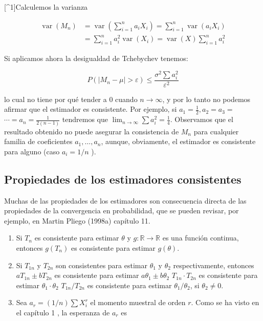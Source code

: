 \documentclass[
]{article}
\providecommand{\tightlist}{%
  \setlength{\itemsep}{0pt}\setlength{\parskip}{0pt}}
\begin{document}
{[}\^{}1{]}Calculemos la varianza

\[
\begin{aligned}
\operatorname{var}\left(M_{n}\right) & =\operatorname{var}\left(\sum_{i=1}^{n} a_{i} X_{i}\right)=\sum_{i=1}^{n} \operatorname{var}\left(a_{i} X_{i}\right) \\
& =\sum_{i=1}^{n} a_{i}^{2} \operatorname{var}\left(X_{i}\right)=\operatorname{var}(X) \sum_{i=1}^{n} a_{i}^{2}
\end{aligned}
\]

Si aplicamos ahora la desigualdad de Tchebychev tenemos:

\[
P\left(\left|M_{n}-\mu\right|>\varepsilon\right) \leq \frac{\sigma^{2} \sum a_{i}^{2}}{\varepsilon^{2}}
\]

lo cual no tiene por qué tender a 0 cuando \(n \rightarrow \infty\), y por lo tanto no podemos afirmar que el estimador es consistente. Por ejemplo, si \(a_{1}=\frac{1}{2}, a_{2}=a_{3}=\) \(\cdots=a_{n}=\frac{1}{2(n-1)}\) tendremos que \(\lim _{n \rightarrow \infty} \sum a_{i}^{2}=\frac{1}{4}\).
Observamos que el resultado obtenido no puede asegurar la consistencia de \(M_{n}\) para cualquier familia de coeficientes \(a_{1}, \ldots, a_{n}\), aunque, obviamente, el estimador es consistente para alguno (caso \(a_{i}=1 / n\) ).

\subsection{Propiedades de los estimadores consistentes}\label{propiedades-de-los-estimadores-consistentes}

Muchas de las propiedades de los estimadores son consecuencia directa de las propiedades de la convergencia en probabilidad, que se pueden revisar, por ejemplo, en Martin Pliego (1998a) capítulo 11.

\begin{enumerate}
\def\labelenumi{\arabic{enumi}.}
\tightlist
\item
  Si \(T_{n}\) es consistente para estimar \(\theta\) y \(g: \mathbb{R} \rightarrow \mathbb{R}\) es una función continua, entonces \(g\left(T_{n}\right)\) es consistente para estimar \(g(\theta)\).
\item
  Si \(T_{1 n}\) y \(T_{2 n}\) son consistentes para estimar \(\theta_{1}\) y \(\theta_{2}\) respectivamente, entonces
  \(a T_{1 n} \pm b T_{2 n}\) es consistente para estimar \(a \theta_{1} \pm b \theta_{2}\)
  \(T_{1 n} \cdot T_{2 n}\) es consistente para estimar \(\theta_{1} \cdot \theta_{2}\)
  \(T_{1 n} / T_{2 n}\) es consistente para estimar \(\theta_{1} / \theta_{2}\), si \(\theta_{2} \neq 0\).
\item
  Sea \(a_{r}=(1 / n) \sum X_{i}^{r}\) el momento muestral de orden \(r\). Como se ha visto en el capítulo 1 , la esperanza de \(a_{r}\) es
\end{enumerate}
\end{document}

